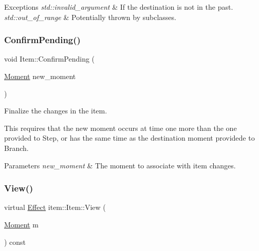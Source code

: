 \begin{DoxyExceptions}{Exceptions}
{\em std\+::invalid\+\_\+argument} & If the destination is not in the past. \\
\hline
{\em std\+::out\+\_\+of\+\_\+range} & Potentially thrown by subclasses. \\
\hline
\end{DoxyExceptions}
\mbox{\label{classitem_1_1_item_a99eaccdd31a817a7cb0e501cb632f711}} 
\subsubsection{\texorpdfstring{Confirm\+Pending()}{ConfirmPending()}}
{\footnotesize\ttfamily void Item\+::\+Confirm\+Pending (\begin{DoxyParamCaption}\item[{\hyperlink{classtimeplane_1_1_moment}{Moment}}]{new\+\_\+moment }\end{DoxyParamCaption})}



Finalize the changes in the item. 

This requires that the new moment occurs at time one more than the one provided to {\ttfamily Step}, or has the same time as the destination moment providede to {\ttfamily Branch}. 
\begin{DoxyParams}{Parameters}
{\em new\+\_\+moment} & The moment to associate with item changes. \\
\hline
\end{DoxyParams}
\mbox{\label{classitem_1_1_item_a7d2b010a27fec55e04a56e7c4fca7837}} 
\subsubsection{\texorpdfstring{View()}{View()}}
{\footnotesize\ttfamily virtual \hyperlink{classitem_1_1_effect}{Effect} item\+::\+Item\+::\+View (\begin{DoxyParamCaption}\item[{\hyperlink{classtimeplane_1_1_moment}{Moment}}]{m }\end{DoxyParamCaption}) const\hspace{0.3cm}{\ttfamily [pure virtual]}}



